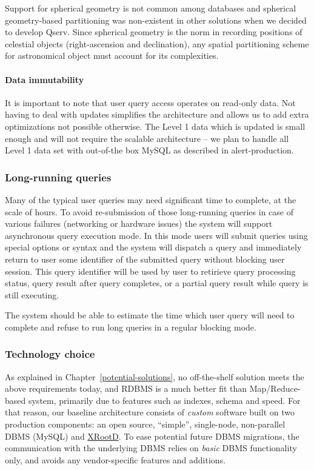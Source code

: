 \documentclass[DM,lsstdraft,toc]{lsstdoc}
\begin{document}
Support for spherical geometry is not common among databases and
spherical geometry-based partitioning was non-existent in other
solutions when we decided to develop Qserv. Since spherical geometry is
the norm in recording positions of celestial objects (right-ascension
and declination), any spatial partitioning scheme for astronomical
object must account for its complexities.

\paragraph{Data immutability}\label{data-immutability}

It is important to note that user query access operates on read-only
data. Not having to deal with updates simplifies the architecture and
allows us to add extra optimizations not possible otherwise. The Level 1
data which is updated is small enough and will not require the scalable
architecture -- we plan to handle all Level 1 data set with out-of-the
box MySQL as described in alert-production.

\subsubsection{Long-running queries}\label{long-running-queries}

Many of the typical user queries may need significant time to complete,
at the scale of hours. To avoid re-submission of those long-running
queries in case of various failures (networking or hardware issues) the
system will support asynchronous query execution mode. In this mode
users will submit queries using special options or syntax and the system
will dispatch a query and immediately return to user some identifier of
the submitted query without blocking user session. This query identifier
will be used by user to retirieve query processing status, query result
after query completes, or a partial query result while query is still
executing.

The system should be able to estimate the time which user query will
need to complete and refuse to run long queries in a regular blocking
mode.

\subsubsection{Technology choice}\label{technology-choice}

As explained in Chapter~\ref{potential-solutions},
no off-the-shelf solution meets the above requirements today, and RDBMS
is a much better fit than Map/Reduce-based system, primarily due to
features such as indexes, schema and speed. For that reason, our
baseline architecture consists of \emph{custom} software built on two
production components: an open source, ``simple'', single-node,
non-parallel DBMS (MySQL) and \href{http://xrootd.org}{XRootD}. To ease
potential future DBMS migrations, the communication with the underlying
DBMS relies on \emph{basic} DBMS functionality only, and avoids any
vendor-specific features and additions.
\end{document}
